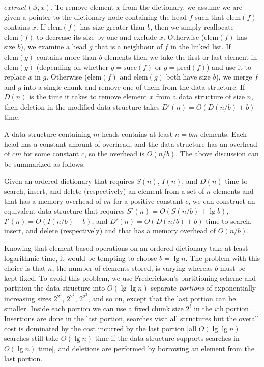 \documentclass{DIKU-article}
\newcommand{\Extract}{\mbox{$\mathit{extract}$}}
\newcommand{\Pred}{\mathrm{pred}}
\newcommand{\Succ}{\mathrm{succ}}
\newcommand{\Elem}{\mathrm{elem}}
\begin{document}
\Extract{}$(\mathcal{S}, x)$.
To remove element $x$ from the dictionary, we assume we are given a
pointer to the dictionary node containing the head $f$ such that
$\Elem(f)$ contains $x$.  If $\Elem(f)$ has size greater than $b$, then
we simply reallocate $\Elem(f)$ to decrease its size by one and exclude
$x$.  Otherwise ($\Elem(f)$ has size $b$), we examine a head $g$
that is a neighbour of $f$ in the linked list.  If $\Elem(g)$ contains
more than $b$ elements then we take the first or last element in
$\Elem(g)$ (depending on whether $g=\Succ(f)$ or $g=\Pred(f)$) and use it
to replace $x$ in $g$.  Otherwise ($\Elem(f)$ and $\Elem(g)$ both have
size $b$), we merge $f$ and $g$ into a single chunk and remove one
of them from the data structure.  If $D(n)$ is the time it takes to
remove element $x$ from a data structure of size $n$, then deletion
in the modified data structure takes $D'(n)=O(D(n/b)+b)$ time.

A data structure containing $m$ heads contains at least $n=bm$
elements.  Each head has a constant amount of overhead, and the data
structure has an overhead of $cm$ for some constant $c$, so the
overhead is $O(n/b)$. The above discussion can be summarized as
follows.

\begin{theorem}
\label{theorem:elementary}
Given an ordered dictionary that requires
$S(n)$, $I(n)$, and $D(n)$ time to search, insert, and delete
(respectively) an element from a set of $n$ elements and that has a memory
overhead of $cn$ for a positive constant $c$, we can construct an equivalent
data structure that requires $S'(n)=O(S(n/b)+\lg b)$,
$I'(n)=O(I(n/b)+b)$, and $D'(n)=O(D(n/b)+b)$ time to
search, insert, and delete (respectively) and that has a memory
overhead of $O(n/b)$.
\end{theorem}

Knowing that element-based operations on an ordered dictionary take at
least logarithmic time, it would be tempting to choose $b = \lg n$. The
problem with this choice is that $n$, the number of elements stored, is
varying whereas $b$ must be kept fixed. To avoid this problem, we use
Frederickson's partitioning scheme
\cite{Fre83} and partition the data structure into $O(\lg\lg n)$
separate \emph{portions}
of exponentially increasing sizes $2^{2^{1}}$, $2^{2^{2}}$,
$2^{2^{3}}$, and so on, except that the last portion can be smaller.
Inside each portion we can use a fixed chunk size
 $2^i$ in the $i$th portion. Insertions are
done in the last portion, searches visit all structures but the
overall cost is dominated by the cost incurred by the last portion
[all $O(\lg\lg n)$ searches still take $O(\lg n)$ time if the data
structure supports searches in $O(\lg n)$ time], and deletions
are performed by borrowing an element from the last portion. 
\end{document}
